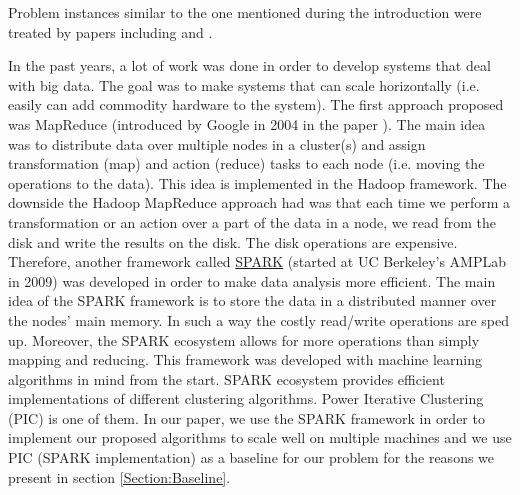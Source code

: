 Problem instances similar to the one mentioned during the introduction were treated by papers including \cite{aupetit2009nearly} and \cite{klawonn2006equi}.

In the past years, a lot of work was done in order to develop systems that deal with big data. The goal was to make systems that can scale horizontally (i.e. easily can add commodity hardware to the system). The first approach proposed was MapReduce (introduced by Google in 2004 in the paper \cite{dean2004mapreduce}). The main idea was to distribute data over multiple nodes in a cluster(s) and assign transformation (map) and action (reduce) tasks to each node (i.e. moving the operations to the data). This idea is implemented in the Hadoop framework. The downside the Hadoop MapReduce approach had was that each time we perform a transformation or an action over a part of the data in a node, we read from the disk and write the results on the disk. The disk operations are expensive. Therefore, another framework called \href{https://spark.apache.org/}{SPARK} (started at UC Berkeley's AMPLab in 2009) was developed in order to make data analysis more efficient. The main idea of the SPARK framework is to store the data in a distributed manner over the nodes' main memory. In such a way the costly read/write operations are sped up. Moreover, the SPARK ecosystem allows for more operations than simply mapping and reducing. This framework was developed with machine learning algorithms in mind from the start. SPARK ecosystem provides efficient implementations of different clustering algorithms. Power Iterative Clustering (PIC) \cite{PIC} is one of them. In our paper, we use the SPARK framework in order to implement our proposed algorithms to scale well on multiple machines and we use PIC (SPARK implementation) as a baseline for our problem for the reasons we present in section \ref{Section:Baseline}.